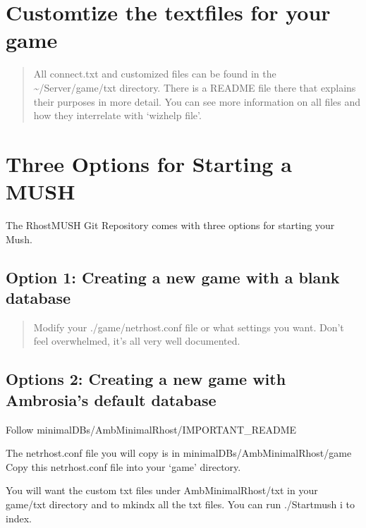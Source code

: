 \documentclass[letterpaper,10pt,english]{sphinxmanual}
\begin{document}
\section{Customtize the textfiles for your game}
\label{\detokenize{install:customtize-the-textfiles-for-your-game}}\begin{quote}

\sphinxAtStartPar
All connect.txt and customized files can be found in the \textasciitilde{}/Server/game/txt directory.  There is a
README file there that explains their purposes in more detail.  You can see more information on
all files and how they inter\sphinxhyphen{}relate with ‘wizhelp file’.
\end{quote}


\section{Three Options for Starting a MUSH}
\label{\detokenize{install:three-options-for-starting-a-mush}}
\sphinxAtStartPar
The RhostMUSH Git Repository comes with three options for starting your Mush.


\subsection{Option 1: Creating a new game with a blank database}
\label{\detokenize{install:option-1-creating-a-new-game-with-a-blank-database}}\begin{quote}

\sphinxAtStartPar
Modify your ./game/netrhost.conf file or what settings you want.
Don’t feel overwhelmed, it’s all very well documented.
\end{quote}


\subsection{Options 2: Creating a new game with Ambrosia’s default database}
\label{\detokenize{install:options-2-creating-a-new-game-with-ambrosia-s-default-database}}
\sphinxAtStartPar
Follow minimal\sphinxhyphen{}DBs/Amb\sphinxhyphen{}MinimalRhost/IMPORTANT\_README

\sphinxAtStartPar
The netrhost.conf file you will copy is in minimal\sphinxhyphen{}DBs/Amb\sphinxhyphen{}MinimalRhost/game
Copy this netrhost.conf file into your ‘game’ directory.

\sphinxAtStartPar
You will want the custom txt files under Amb\sphinxhyphen{}MinimalRhost/txt in your game/txt directory and to mkindx all the txt files.  You can run ./Startmush \sphinxhyphen{}i to index.
\end{document}
